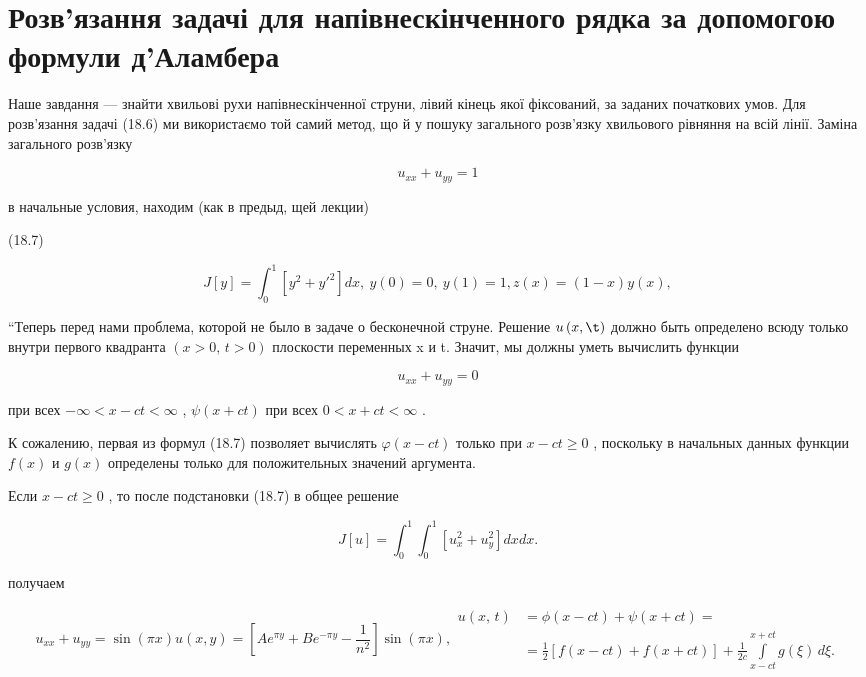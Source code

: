 \documentclass[
  ukrainian,
]{article}
\begin{document}
\section{Розв'язання задачі для напівнескінченного рядка за допомогою
формули
д'Аламбера}\label{ux440ux43eux437ux432ux44fux437ux430ux43dux43dux44f-ux437ux430ux434ux430ux447ux456-ux434ux43bux44f-ux43dux430ux43fux456ux432ux43dux435ux441ux43aux456ux43dux447ux435ux43dux43dux43eux433ux43e-ux440ux44fux434ux43aux430-ux437ux430-ux434ux43eux43fux43eux43cux43eux433ux43eux44e-ux444ux43eux440ux43cux443ux43bux438-ux434ux430ux43bux430ux43cux431ux435ux440ux430}

Наше завдання --- знайти хвильові рухи напівнескінченної струни, лівий
кінець якої фіксований, за заданих початкових умов. Для розв'язання
задачі (18.6) ми використаємо той самий метод, що й у пошуку загального
розв'язку хвильового рівняння на всій лінії. Заміна загального розв'язку

\[
u_{xx} + u_{yy} = 1
\]

в начальные условия, находим (как в предыд, щей лекции)

(18.7)

\[
J[y] = \int_{0}^{1} [y^{2} + {y'}^{2}] dx, \ y(0) = 0, \ y(1) = 1,
z(x) = (1 - x) y(x),
\]

``Теперь перед нами проблема, которой не было в задаче о бесконечной
струне. Решение \(u\left(x,\t\right)\) должно быть определено всюду
только внутри первого квадранта \((x>0,\,t>0)\) плоскости переменных x и
t. Значит, мы должны уметь вычислить функции

\[
u_{xx} + u_{yy} = 0
\]

при всех \(-\infty < x-ct < \infty\) , \(\psi(x+ct)\) при всех
\(0 < x+ct < \infty\) .

К сожалению, первая из формул (18.7) позволяет вычислять
\(\varphi(x-ct)\) только при \(x-ct\geqslant 0\) , поскольку в начальных
данных функции \(f(x)\) и \(g(x)\) определены только для положительных
значений аргумента.

Если \(x-ct \geqslant 0\) , то после подстановки (18.7) в общее решение

\[
J[u] = \int_{0}^{1} \int_{0}^{1} [u_{x}^{2} + u_{y}^{2}] dx dx.
\]

получаем

\[
u_{xx} + u_{yy} = \sin(\pi x)
u(x, y) = \left[Ae^{\pi y} + Be^{-\pi y} - \frac{1}{n^2}\right] \sin(\pi x),
\begin{split} u\left(x,\,t\right) &= \phi\left(x-ct\right) + \psi\left(x+ct\right) = \\ &= \frac{1}{2} \left[ f\left(x-ct\right) + f\left(x+ct\right) \right] + \frac{1}{2c} \int\limits_{x-ct}^{x+ct} g\left(\xi\right) \, d\xi. \end{split}
\]
\end{document}
